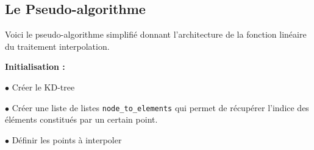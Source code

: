 \subsection{Le Pseudo-algorithme}


Voici le pseudo-algorithme simplifié donnant l'architecture de la fonction linéaire du traitement interpolation.

\vspace{0.5cm}

\textbf{Initialisation :}

$\bullet$ Créer le KD-tree

$\bullet$ Créer une liste de listes \texttt{node\_to\_elements} qui permet de récupérer l'indice des éléments constitués par un certain point.

$\bullet$ Définir les points à interpoler

\vspace{0.5cm}

